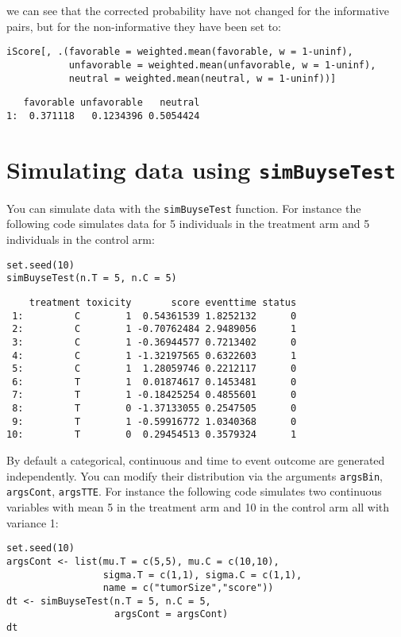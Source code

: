 \documentclass[12pt]{article}
\begin{document}
we can see that the corrected probability have not changed for the
informative pairs, but for the non-informative they have been set to:
\lstset{language=r,label= ,caption= ,captionpos=b,numbers=none}
\begin{lstlisting}
iScore[, .(favorable = weighted.mean(favorable, w = 1-uninf), 
		   unfavorable = weighted.mean(unfavorable, w = 1-uninf), 
		   neutral = weighted.mean(neutral, w = 1-uninf))]
\end{lstlisting}

\begin{verbatim}
   favorable unfavorable   neutral
1:  0.371118   0.1234396 0.5054424
\end{verbatim}

\clearpage

\section{Simulating data using \texttt{simBuyseTest}}
\label{sec:org8cc28a2}
You can simulate data with the \texttt{simBuyseTest} function. For instance
the following code simulates data for 5 individuals in the treatment
arm and 5 individuals in the control arm:
\lstset{language=r,label= ,caption= ,captionpos=b,numbers=none}
\begin{lstlisting}
set.seed(10)
simBuyseTest(n.T = 5, n.C = 5)
\end{lstlisting}

\begin{verbatim}
    treatment toxicity       score eventtime status
 1:         C        1  0.54361539 1.8252132      0
 2:         C        1 -0.70762484 2.9489056      1
 3:         C        1 -0.36944577 0.7213402      0
 4:         C        1 -1.32197565 0.6322603      1
 5:         C        1  1.28059746 0.2212117      0
 6:         T        1  0.01874617 0.1453481      0
 7:         T        1 -0.18425254 0.4855601      0
 8:         T        0 -1.37133055 0.2547505      0
 9:         T        1 -0.59916772 1.0340368      0
10:         T        0  0.29454513 0.3579324      1
\end{verbatim}

By default a categorical, continuous and time to event outcome are
generated independently. You can modify their distribution via the
arguments \texttt{argsBin}, \texttt{argsCont}, \texttt{argsTTE}. For instance the following
code simulates two continuous variables with mean 5 in the treatment
arm and 10 in the control arm all with variance 1:
\lstset{language=r,label= ,caption= ,captionpos=b,numbers=none}
\begin{lstlisting}
set.seed(10)
argsCont <- list(mu.T = c(5,5), mu.C = c(10,10), 
				 sigma.T = c(1,1), sigma.C = c(1,1),
				 name = c("tumorSize","score"))
dt <- simBuyseTest(n.T = 5, n.C = 5,
				   argsCont = argsCont)
dt
\end{lstlisting}
\end{document}
